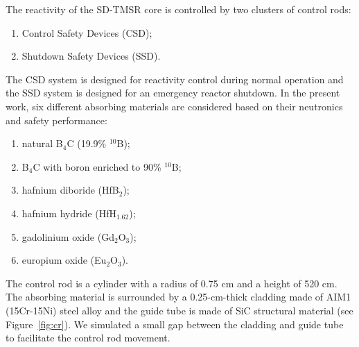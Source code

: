 The reactivity of the SD-TMSR core is controlled by two clusters of control 
rods:
\begin{enumerate}
\item Control Safety Devices (CSD);
\item Shutdown Safety Devices (SSD).
\end{enumerate}
The CSD system is designed for reactivity control during normal operation and the SSD system is designed for an emergency reactor shutdown.
In the present work, six different absorbing materials are considered based on their neutronics and safety performance:
\begin{enumerate}
\item natural B$_4$C (19.9\% $^{10}$B);
\item B$_4$C with boron enriched to 90\% $^{10}$B;
\item hafnium diboride (HfB$_2$);
\item hafnium hydride (HfH$_{1.62}$);
\item gadolinium oxide (Gd$_2$O$_3$);
\item europium oxide (Eu$_2$O$_3$).
\end{enumerate}

The control rod is a cylinder with a radius of 0.75 cm and a height of 520 cm. 
The absorbing material is surrounded by a 0.25-cm-thick cladding made of AIM1 
(15Cr-15Ni) steel alloy \cite{SERAN2017285} and the guide tube is made of 
SiC structural material (see Figure~\ref{fig:cr}). We simulated a small gap between the 
cladding and guide tube to facilitate the control rod movement.

